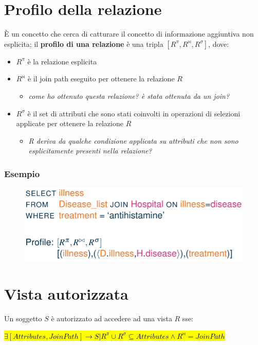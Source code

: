 \documentclass{report}
\begin{document}
\section{Profilo della relazione}
È un concetto che cerca di catturare il concetto di informazione aggiuntiva non esplicita;
il \textbf{profilo di una relazione} è una tripla $[R^\pi, R^{\bowtie}, R^\sigma]$, dove:
\begin{itemize}
    \item $R^\pi$ è la relazione esplicita
    \item $R^{\bowtie}$ è il join path eseguito per ottenere la relazione $R$
    \begin{itemize}
        \item \textit{come ho ottenuto questa relazione? è stata ottenuta da un join?}
    \end{itemize}
    \item $R^\sigma$ è il set di attributi che sono stati coinvolti in operazioni di selezioni 
    applicate per ottenere la relazione $R$
    \begin{itemize}
        \item \textit{R deriva da qualche condizione applicata su attributi che non sono esplicitamente presenti nella relazione?}
    \end{itemize}
\end{itemize}

\subsubsection{Esempio}

\begin{figure}[H]
    \centering
    \includegraphics[width=0.7\linewidth]{images/relation-profile-ex.png}
\end{figure}

\section{Vista autorizzata}

Un soggetto $S$ è autorizzato ad accedere ad una vista $R$ sse:

\noindent \hl{ $\exists [Attributes, Join Path]
\rightarrow S | R^\pi \cup R^\sigma \subseteq Attributes \wedge  R^{\bowtie} = Join Path$}
\end{document}
